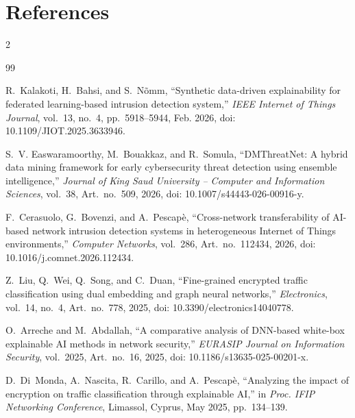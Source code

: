 \section*{References}
\begin{multicols}{2}
\renewcommand{\section}[2]{}%
\begin{thebibliography}{99}
\footnotesize

R.~Kalakoti, H.~Bahsi, and S.~N\~{o}mm, ``Synthetic data-driven explainability for federated learning-based intrusion detection system,'' \textit{IEEE Internet of Things Journal}, vol.~13, no.~4, pp.~5918--5944, Feb. 2026, doi: 10.1109/JIOT.2025.3633946.

S.~V. Easwaramoorthy, M.~Bouakkaz, and R.~Somula, ``DMThreatNet: A hybrid data mining framework for early cybersecurity threat detection using ensemble intelligence,'' \textit{Journal of King Saud University -- Computer and Information Sciences}, vol.~38, Art.~no.~509, 2026, doi: 10.1007/s44443-026-00916-y.

F.~Cerasuolo, G.~Bovenzi, and A.~Pescap\`{e}, ``Cross-network transferability of AI-based network intrusion detection systems in heterogeneous Internet of Things environments,'' \textit{Computer Networks}, vol.~286, Art.~no.~112434, 2026, doi: 10.1016/j.comnet.2026.112434.

Z.~Liu, Q.~Wei, Q.~Song, and C.~Duan, ``Fine-grained encrypted traffic classification using dual embedding and graph neural networks,'' \textit{Electronics}, vol.~14, no.~4, Art.~no.~778, 2025, doi: 10.3390/electronics14040778.

O.~Arreche and M.~Abdallah, ``A comparative analysis of DNN-based white-box explainable AI methods in network security,'' \textit{EURASIP Journal on Information Security}, vol.~2025, Art.~no.~16, 2025, doi: 10.1186/s13635-025-00201-x.

D.~Di~Monda, A.~Nascita, R.~Carillo, and A.~Pescap\`{e}, ``Analyzing the impact of encryption on traffic classification through explainable AI,'' in \textit{Proc. IFIP Networking Conference}, Limassol, Cyprus, May 2025, pp.~134--139.


\end{thebibliography}
\end{multicols}
